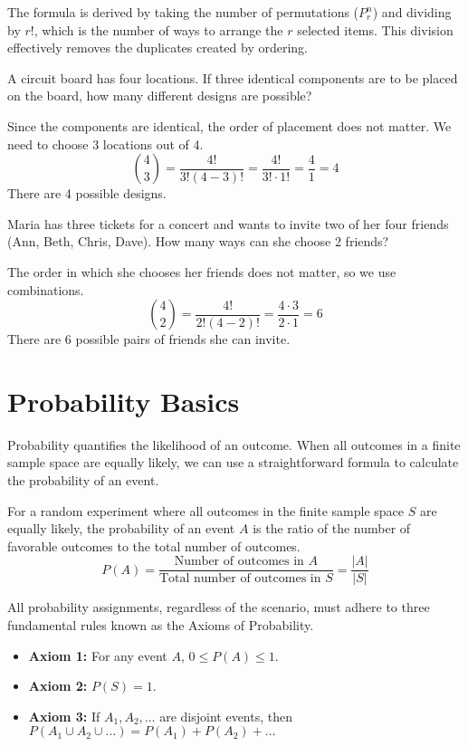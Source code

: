 The formula is derived by taking the number of permutations ($P_r^n$) and dividing by $r!$, which is the number of ways to arrange the $r$ selected items. This division effectively removes the duplicates created by ordering.

\begin{example}
    A circuit board has four locations. If three identical components are to be placed on the board, how many different designs are possible?
\end{example}
\begin{solution}
    Since the components are identical, the order of placement does not matter. We need to choose 3 locations out of 4.
    \[ \binom{4}{3} = \frac{4!}{3!(4-3)!} = \frac{4!}{3! \cdot 1!} = \frac{4}{1} = 4 \]
    There are 4 possible designs.
\end{solution}

\begin{example}
    Maria has three tickets for a concert and wants to invite two of her four friends (Ann, Beth, Chris, Dave). How many ways can she choose 2 friends?
\end{example}
\begin{solution}
    The order in which she chooses her friends does not matter, so we use combinations.
    \[ \binom{4}{2} = \frac{4!}{2!(4-2)!} = \frac{4 \cdot 3}{2 \cdot 1} = 6 \]
    There are 6 possible pairs of friends she can invite.
\end{solution}

\section{Probability Basics}
Probability quantifies the likelihood of an outcome. When all outcomes in a finite sample space are equally likely, we can use a straightforward formula to calculate the probability of an event.

\begin{definition}
    For a random experiment where all outcomes in the finite sample space $S$ are equally likely, the probability of an event $A$ is the ratio of the number of favorable outcomes to the total number of outcomes.
    \[ P(A) = \frac{\text{Number of outcomes in } A}{\text{Total number of outcomes in } S} = \frac{|A|}{|S|} \]
\end{definition}

All probability assignments, regardless of the scenario, must adhere to three fundamental rules known as the Axioms of Probability.
\begin{axiom}
    \begin{itemize}
        \item \textbf{Axiom 1:} For any event $A$, $0 \leq P(A) \leq 1$.
        \item \textbf{Axiom 2:} $P(S) = 1$.
        \item \textbf{Axiom 3:} If $A_1, A_2, \dots$ are disjoint events, then $P(A_1 \cup A_2 \cup \dots) = P(A_1) + P(A_2) + \dots$
    \end{itemize}
\end{axiom}

